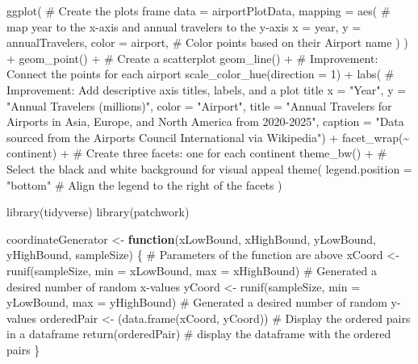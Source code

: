 \documentclass[
  letterpaper,
  DIV=11,
  numbers=noendperiod]{scrartcl}
\newenvironment{Shaded}{\begin{snugshade}}{\end{snugshade}}
\newcommand{\AttributeTok}[1]{\textcolor[rgb]{0.40,0.45,0.13}{#1}}
\newcommand{\CommentTok}[1]{\textcolor[rgb]{0.37,0.37,0.37}{#1}}
\newcommand{\ControlFlowTok}[1]{\textcolor[rgb]{0.00,0.23,0.31}{\textbf{#1}}}
\newcommand{\DecValTok}[1]{\textcolor[rgb]{0.68,0.00,0.00}{#1}}
\newcommand{\FunctionTok}[1]{\textcolor[rgb]{0.28,0.35,0.67}{#1}}
\newcommand{\NormalTok}[1]{\textcolor[rgb]{0.00,0.23,0.31}{#1}}
\newcommand{\OtherTok}[1]{\textcolor[rgb]{0.00,0.23,0.31}{#1}}
\newcommand{\SpecialCharTok}[1]{\textcolor[rgb]{0.37,0.37,0.37}{#1}}
\newcommand{\StringTok}[1]{\textcolor[rgb]{0.13,0.47,0.30}{#1}}
\begin{document}
\begin{Shaded}
\begin{Highlighting}[]
\FunctionTok{ggplot}\NormalTok{( }\CommentTok{\# Create the plot\textquotesingle{}s frame}
  \AttributeTok{data =}\NormalTok{ airportPlotData,}
  \AttributeTok{mapping =} \FunctionTok{aes}\NormalTok{( }\CommentTok{\# map year to the x{-}axis and annual travelers to the y{-}axis}
    \AttributeTok{x =}\NormalTok{ year,}
    \AttributeTok{y =}\NormalTok{ annualTravelers,}
    \AttributeTok{color =}\NormalTok{ airport, }\CommentTok{\# Color points based on their Airport name}
\NormalTok{  )}
\NormalTok{) }\SpecialCharTok{+}
  \FunctionTok{geom\_point}\NormalTok{() }\SpecialCharTok{+} \CommentTok{\# Create a scatterplot}
  \FunctionTok{geom\_line}\NormalTok{() }\SpecialCharTok{+} \CommentTok{\# Improvement: Connect the points for each airport}
  \FunctionTok{scale\_color\_hue}\NormalTok{(}\AttributeTok{direction =} \DecValTok{1}\NormalTok{) }\SpecialCharTok{+}
  \FunctionTok{labs}\NormalTok{( }\CommentTok{\# Improvement: Add descriptive axis titles, labels, and a plot title}
    \AttributeTok{x =} \StringTok{"Year"}\NormalTok{,}
    \AttributeTok{y =} \StringTok{"Annual Travelers (millions)"}\NormalTok{,}
    \AttributeTok{color =} \StringTok{"Airport"}\NormalTok{,}
    \AttributeTok{title =} \StringTok{"Annual Travelers for Airports in Asia, Europe, and North America from 2020{-}2025"}\NormalTok{,}
    \AttributeTok{caption =} \StringTok{"Data sourced from the Airports Council International via Wikipedia"}\NormalTok{) }\SpecialCharTok{+}
  \FunctionTok{facet\_wrap}\NormalTok{(}\SpecialCharTok{\textasciitilde{}}\NormalTok{ continent) }\SpecialCharTok{+} \CommentTok{\# Create three facets: one for each continent }
  \FunctionTok{theme\_bw}\NormalTok{() }\SpecialCharTok{+} \CommentTok{\# Select the black and white background for visual appeal}
  \FunctionTok{theme}\NormalTok{(}
    \AttributeTok{legend.position =} \StringTok{"bottom"} \CommentTok{\# Align the legend to the right of the facets}
\NormalTok{  )}

\FunctionTok{library}\NormalTok{(tidyverse)}
\FunctionTok{library}\NormalTok{(patchwork)}

\NormalTok{coordinateGenerator }\OtherTok{\textless{}{-}} \ControlFlowTok{function}\NormalTok{(xLowBound, xHighBound, yLowBound, yHighBound, sampleSize) \{ }
  \CommentTok{\# Parameters of the function are above}
\NormalTok{  xCoord }\OtherTok{\textless{}{-}} \FunctionTok{runif}\NormalTok{(sampleSize, }\AttributeTok{min =}\NormalTok{ xLowBound, }\AttributeTok{max =}\NormalTok{ xHighBound) }
  \CommentTok{\# Generated a desired number of random x{-}values}
\NormalTok{  yCoord }\OtherTok{\textless{}{-}} \FunctionTok{runif}\NormalTok{(sampleSize, }\AttributeTok{min =}\NormalTok{ yLowBound, }\AttributeTok{max =}\NormalTok{ yHighBound)}
  \CommentTok{\# Generated a desired number of random y{-}values}
\NormalTok{  orderedPair }\OtherTok{\textless{}{-}}\NormalTok{ (}\FunctionTok{data.frame}\NormalTok{(xCoord, yCoord)) }
  \CommentTok{\# Display the ordered pairs in a dataframe}
  \FunctionTok{return}\NormalTok{(orderedPair) }\CommentTok{\# display the dataframe with the ordered pairs}
\NormalTok{\}}


\end{Highlighting}
\end{Shaded}
\end{document}
